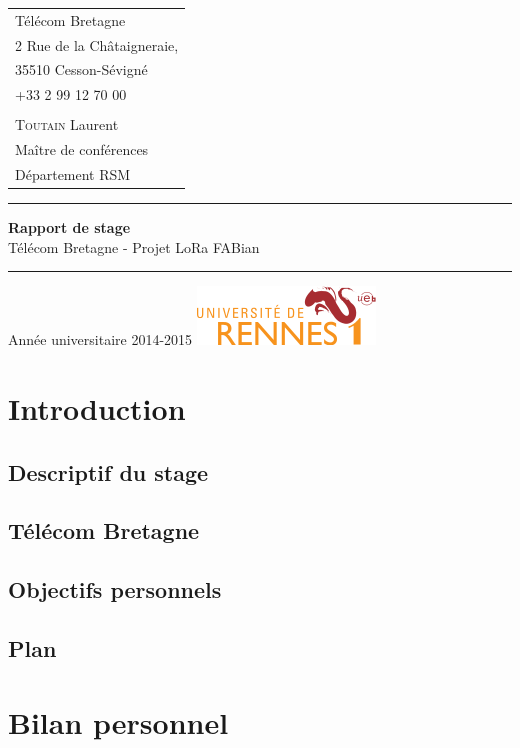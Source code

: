 \documentclass{article}
\begin{document}
\begin{titlepage}
\begin{tabular}{l}
		Télécom Bretagne\\
		2 Rue de la Châtaigneraie,\\
		35510 Cesson-Sévigné\\
		+33 2 99 12 70 00\\
		\\
		\textsc{Toutain} Laurent\\
		Maître de conférences\\
		Département RSM
	\end{tabular}
	\vfill
	\begin{center}
		\vspace{0.5cm}\hrule\vspace{0.5cm}
		\LARGE{\textbf{Rapport de stage}}\\
		\Large{Télécom Bretagne - Projet LoRa FABian}
		\vspace{0.5cm}\hrule
	\end{center}
	\vfill
	\begin{flushleft}
		\Large{Année universitaire 2014-2015}
		\hspace{4cm}
		\includegraphics[scale=0.6]{univ}
	\end{flushleft}
\end{titlepage}

\section{Introduction}
\subsection{Descriptif du stage}
\subsection{Télécom Bretagne}
\subsection{Objectifs personnels}
\subsection{Plan}

\section{Bilan personnel}
\end{document}

